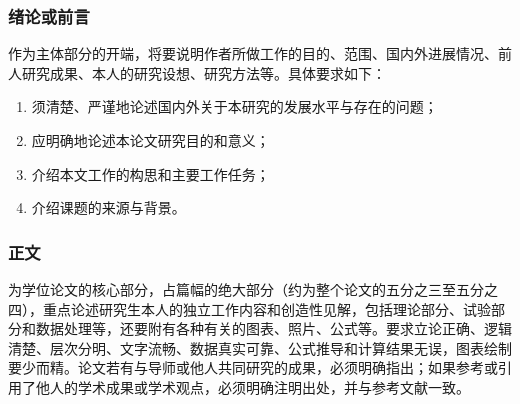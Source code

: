 \subsubsection{绪论或前言}
作为主体部分的开端，将要说明作者所做工作的目的、范围、国内外进展情况、前人研究成果、本人的研究设想、研究方法等。具体要求如下：
\begin{enumerate}[1)]
    \item 须清楚、严谨地论述国内外关于本研究的发展水平与存在的问题；
    \item 应明确地论述本论文研究目的和意义；
    \item 介绍本文工作的构思和主要工作任务；
    \item 介绍课题的来源与背景。
\end{enumerate}

\subsubsection{正文}
为学位论文的核心部分，占篇幅的绝大部分（约为整个论文的五分之三至五分之四），重点论述研究生本人的独立工作内容和创造性见解，包括理论部分、试验部分和数据处理等，还要附有各种有关的图表、照片、公式等。要求立论正确、逻辑清楚、层次分明、文字流畅、数据真实可靠、公式推导和计算结果无误，图表绘制要少而精。论文若有与导师或他人共同研究的成果，必须明确指出；如果参考或引用了他人的学术成果或学术观点，必须明确注明出处，并与参考文献一致。
